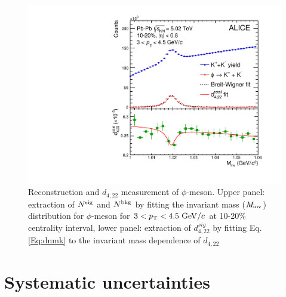 \documentclass[ALICE,manyauthors]{cernphprep}
\begin{document}
\begin{figure}[!htb]
\begin{center}
\includegraphics[scale=0.45]{figures/analysisMethod/flowmass_Phi.pdf}
\end{center}
\caption{Reconstruction and $d_{4,22}$ measurement of $\phi$-meson. Upper panel: extraction of $N^{\rm{sig}}$ and $N^{\rm{bkg}}$ by fitting the invariant mass (${\it M}_{\rm{inv}}$) distribution for $\phi$-meson for $3<p_{\rm{T}}<4.5~{\rm GeV}/c$ at 10-20\% centrality interval, lower panel: extraction of $d_{4,22}^{sig}$ by fitting Eq. \ref{Eq:dnmk} to the invariant mass dependence of $d_{4,22}$}
\label{d422_phi_meson}
\end{figure}


\section{Systematic uncertainties}
\label{Sec:Systematics}
\end{document}
